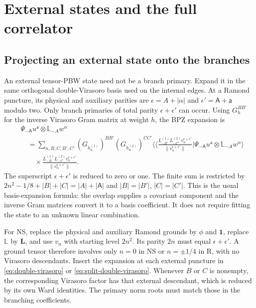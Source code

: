 \documentclass[11pt]{article}
\numberwithin{equation}{section}
\begin{document}
\section{External states and the full correlator}
\label{sec:external}

\subsection{Projecting an external state onto the branches}

An external tensor-PBW state need not be a branch primary. Expand it in
the same orthogonal double-Virasoro basis used on the internal edges.
At a Ramond puncture, its physical and auxiliary parities are
$\epsilon=A+|\alpha|$ and $\epsilon'=\mathsf A+\mathsf a$ modulo two.
Only branch primaries of total parity $\epsilon+\epsilon'$ can occur.
Using $G^{BB'}_h$ for the inverse Virasoro Gram matrix at weight $h$,
the BPZ expansion is
\begin{align}
 &\Psi_{-\mathsf A}u^{\mathsf a}\otimes\mathbb L_{-A}w^\alpha
 \nonumber\\
 &\quad=\sum_{n,B,C,B',C'}
 (G_{h_n^{(1)}})^{BB'}(G_{h_n^{(2)}})^{CC'}
 \Big\langle\!\Big\langle
 \frac{L_{-B'}^{(1)}L_{-C'}^{(2)}v_n^{\epsilon+\epsilon'}}
      {\|v_n^{\epsilon+\epsilon'}\|}
 \Big|\Psi_{-\mathsf A}u^{\mathsf a}\otimes\mathbb L_{-A}w^\alpha
 \Big\rangle
 \nonumber\\
 &\qquad\times
 \frac{L_{-B}^{(1)}L_{-C}^{(2)}v_n^{\epsilon+\epsilon'}}
      {\|v_n^{\epsilon+\epsilon'}\|}.
 \label{eq:external-descendants}
\end{align}
The superscript $\epsilon+\epsilon'$ is reduced to zero or one.
The finite sum is restricted by
$2n^2-1/8+|B|+|C|=|A|+|\mathsf A|$ and
$|B|=|B'|$, $|C|=|C'|$. This is the usual basis-expansion formula:
the overlap supplies a covariant component and the inverse Gram matrices
convert it to a basis coefficient. It does not require fitting the state
to an unknown linear combination.

For NS, replace the physical and auxiliary Ramond grounds by $\phi$ and
$\mathbf1$, replace $\mathbb L$ by $\mathbf L$, and use $v_n$ with
starting level $2n^2$. Its parity $2n$ must equal $\epsilon+\epsilon'$.
A ground tensor therefore involves only $n=0$ in NS or $n=\pm1/4$ in R,
with no Virasoro descendants. Insert the expansion at each external
puncture in \eqref{eq:double-virasoro} or
\eqref{eq:split-double-virasoro}. Whenever $B$ or $C$ is nonempty, the
corresponding Virasoro factor has that external descendant, which is
reduced by its own Ward identities. The primary norm roots must match
those in the branching coefficients.
\end{document}
